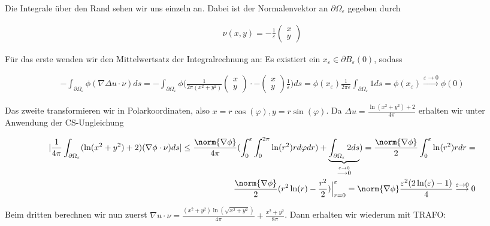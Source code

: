 \begin{solution}
Die Integrale über den Rand sehen wir uns einzeln an. Dabei ist der Normalenvektor an
$\partial \Omega_\varepsilon$ gegeben durch

\begin{align*}
  \nu(x,y)
  =
  -\frac{1}{\varepsilon}
  \left(\begin{array}{c}
    x \\
    y
  \end{array}\right)
\end{align*}

Für das erste wenden wir den Mittelwertsatz der Integralrechnung an: Es existiert
ein $x_\varepsilon \in \partial B_\varepsilon(0)$, sodass

\begin{align*}
  -\int_{\partial \Omega_\varepsilon} \phi (\nabla \Delta u \cdot \nu) ds
  =
  -\int_{\partial \Omega_\varepsilon} \phi
  \Big(\frac{1}{2\pi (x^2+y^2)}
  \begin{pmatrix} x \\ y \end{pmatrix} \cdot
  - \begin{pmatrix} x \\ y \end{pmatrix}
  \frac{1}{\varepsilon}\Big) ds
  =
  \phi(x_\varepsilon) \frac{1}{2\pi \varepsilon} \int_{\partial \Omega_\varepsilon} 1 ds
  =
  \phi(x_\varepsilon)
  \stackrel{\varepsilon \rightarrow 0}{\longrightarrow}
  \phi(0)
\end{align*}

Das zweite transformieren wir in Polarkoordinaten, also $x = r\cos(\varphi), y = r\sin(\varphi)$.
Da $\Delta u = \frac{\ln(x^2 +y^2) + 2}{4 \pi}$ erhalten wir unter Anwendung der CS-Ungleichung

\begin{align*}
  |\frac{1}{4\pi} \int_{\partial \Omega_\varepsilon} (\ln(x^2 + y^2) + 2) (\nabla \phi \cdot \nu) ds|
  \leq
  \frac{\norm{\nabla \phi}}{4 \pi} (\int_0^\varepsilon \int_0^{2 \pi} \ln(r^2) r d\varphi dr) + \underbrace{\int_{\partial \Omega_\varepsilon} 2 ds}_{\stackrel{\varepsilon \rightarrow 0}{\longrightarrow 0}})
  =
  \frac{\norm{\nabla \phi}}{2} \int_0^\varepsilon \ln(r^2) r dr
  = \\
  \frac{\norm{\nabla \phi}}{2} (r^2\ln(r) - \frac{r^2}{2})\Big|_{r = 0}^\varepsilon
  =
  \norm{\nabla \phi}\frac{\varepsilon^2(2\ln(\varepsilon)-1)}{4}
  \stackrel{\varepsilon \rightarrow 0}{\longrightarrow}
  0
\end{align*}

Beim dritten berechnen wir nun zuerst $\nabla u \cdot \nu = \frac{(x^2+y^2)\ln(\sqrt{x^2+y^2})}{4\pi}+\frac{x^2+y^2}{8\pi}$.
Dann erhalten wir wiederum mit TRAFO:


\end{solution}
